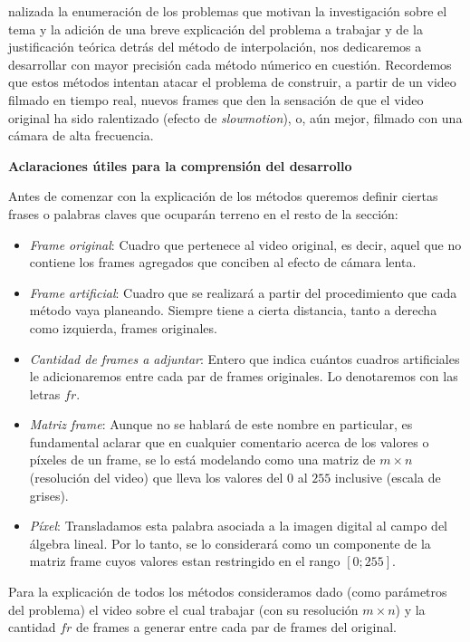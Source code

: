 
nalizada la enumeraci\'on de los problemas que motivan la investigaci\'on sobre el tema y la adici\'on de una breve explicaci\'on del problema a trabajar y de la justificación teórica detrás del método de interpolación, nos dedicaremos a desarrollar con mayor precisi\'on cada m\'etodo n\'umerico en cuesti\'on. Recordemos que estos métodos intentan atacar el problema de construir, a partir de un video filmado en tiempo real, nuevos frames que den la sensaci\'on de que el video original ha sido ralentizado (efecto de \emph{slowmotion}), o, aún mejor, filmado con una cámara de alta frecuencia.

\textbf{Aclaraciones \'utiles para la comprensi\'on del desarrollo}

Antes de comenzar con la explicaci\'on de los m\'etodos queremos definir ciertas frases o palabras claves que ocupar\'an terreno en el resto de la secci\'on:

\begin{itemize}
	\item \textit{Frame original}: Cuadro que pertenece al video original, es decir, aquel que no contiene los frames agregados que conciben al efecto de c\'amara lenta.
	\item \textit{Frame artificial}: Cuadro que se realizar\'a a partir del procedimiento que cada m\'etodo vaya planeando. Siempre tiene a cierta distancia, tanto a derecha como izquierda, frames originales.
	\item \textit{Cantidad de frames a adjuntar}: Entero que indica cu\'antos cuadros artificiales le adicionaremos entre cada par de frames originales. Lo denotaremos con las letras $fr$.
	\item \textit{Matriz frame}: Aunque no se hablar\'a de este nombre en particular, es fundamental aclarar que en cualquier comentario acerca de los valores o p\'ixeles de un frame, se lo est\'a modelando como una matriz de $m \times n$ (resoluci\'on del video) que lleva los valores del $0$ al $255$ inclusive (escala de grises).
    \item \textit{P\'ixel}: Transladamos esta palabra asociada a la imagen digital al campo del \'algebra lineal. Por lo tanto, se lo considerar\'a como un componente de la matriz frame cuyos valores estan restringido en el rango $[0;255]$.
\end{itemize}

Para la explicación de todos los métodos consideramos dado (como parámetros del problema) el video sobre el cual trabajar (con su resolución $m \times n$) y la cantidad $fr$ de frames a generar entre cada par de frames del original.

